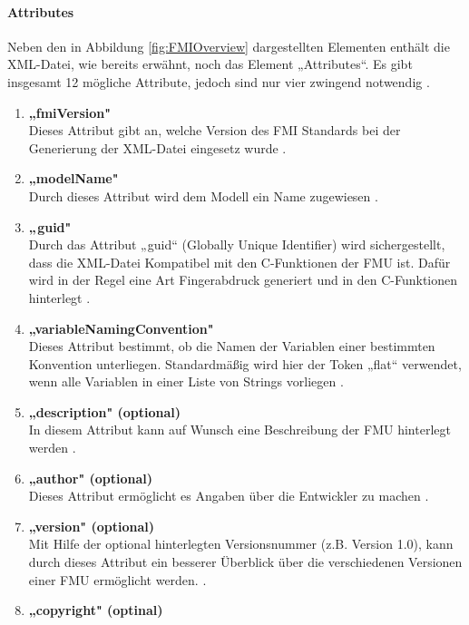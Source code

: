 \paragraph{Attributes}\label{sec:AttributeFMU}
\noindent Neben den in Abbildung \ref{fig:FMIOverview} dargestellten Elementen enthält die XML-Datei, wie bereits erwähnt, noch das Element „Attributes“. Es gibt insgesamt 12 mögliche Attribute, jedoch sind nur vier zwingend notwendig \cite[S.33]{25}.
\begin{enumerate}
	\item \textbf{„fmiVersion"} \cite[S.33]{25} \\
	Dieses Attribut gibt an, welche Version des FMI Standards bei der Generierung der XML-Datei
	eingesetz wurde \cite[S.33]{25}.
	\item \textbf{„modelName"} \cite[S.33]{25} \\
	Durch dieses Attribut wird dem Modell ein Name zugewiesen \cite[S.33]{25}.
	\item \textbf{„guid"} \cite[S.33]{25} \\
	Durch das Attribut „guid“ (Globally Unique Identifier) wird sichergestellt, dass die XML-Datei Kompatibel mit den C-Funktionen der FMU ist. Dafür wird in der Regel eine Art Fingerabdruck generiert und in den C-Funktionen hinterlegt \cite[S.33]{25}.
	\item \textbf{„variableNamingConvention"} \cite[S.33]{25} \\
	Dieses Attribut bestimmt, ob die Namen der Variablen einer bestimmten Konvention 
	unterliegen. Standardmäßig wird hier der Token „flat“ verwendet, wenn alle Variablen
	in einer Liste von Strings vorliegen \cite[S.33]{25}.
	\item \textbf{„description" (optional)} \cite[S.33]{25} \\
	In diesem Attribut kann auf Wunsch eine Beschreibung der FMU hinterlegt werden \cite[S.33]{25}.
	\item \textbf{„author" (optional)} \cite[S.33]{25} \\
	Dieses Attribut ermöglicht es Angaben über die Entwickler zu machen \cite[S.33]{25}.
	\item \textbf{„version" (optional)} \cite[S.33]{25} \\
	Mit Hilfe der optional hinterlegten Versionsnummer (z.B. Version 1.0), kann durch dieses Attribut ein besserer Überblick über die verschiedenen Versionen einer FMU ermöglicht werden. \cite[S.33]{25}.
	\item \textbf{„copyright" (optinal)} \cite[S.33]{25} \\

\end{enumerate}
